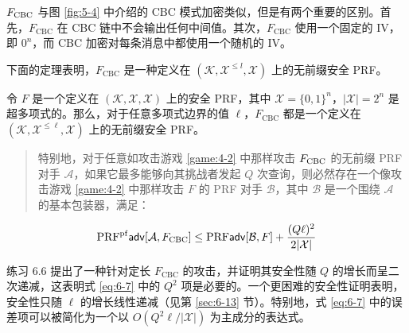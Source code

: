 \vspace*{5pt}

\noindent
$F_{\rm CBC}$ 与图 \ref{fig:5-4}	中介绍的 CBC 模式加密类似，但是有两个重要的区别。首先，$F_\mathrm{CBC}$ 在 CBC 链中不会输出任何中间值。其次，$F_\mathrm{CBC}$ 使用一个固定的 IV，即 $0^n$，而 CBC 加密对每条消息中都使用一个随机的 IV。

下面的定理表明，$F_\mathrm{CBC}$ 是一种定义在 $(\mathcal{K},\mathcal{X}^{\leq l},\mathcal{X})$ 上的无前缀安全 PRF。

\begin{theorem}\label{theo:6-3}
令 $F$ 是一个定义在 $(\mathcal{K},\mathcal{X},\mathcal{X})$ 上的安全 PRF，其中 $\mathcal{X}=\{0,1\}^n$，$|\mathcal{X}|=2^n$ 是超多项式的。那么，对于任意多项式边界的值 $\ell$，$F_\mathrm{CBC}$ 都是一个定义在 $(\mathcal{K},\mathcal{X}^{\leq\ell},\mathcal{X})$ 上的无前缀安全 PRF。
\begin{quote}
特别地，对于任意如攻击游戏 \ref{game:4-2} 中那样攻击 $F_{\rm CBC}$ 的无前缀 PRF 对手 $\mathcal{A}$，如果它最多能够向其挑战者发起 $Q$ 次查询，则必然存在一个像攻击游戏 \ref{game:4-2} 中那样攻击 $F$ 的 PRF 对手 $\mathcal{B}$，其中 $\mathcal{B}$ 是一个围绕 $\mathcal{A}$ 的基本包装器，满足：
\end{quote}
\begin{equation}\label{eq:6-7}
{\rm PRF^{pf}\mathsf{adv}}[\mathcal{A},F_{\rm CBC}]\leq{\rm PRF\mathsf{adv}}[\mathcal{B},F]+\frac{(Q\ell)^2}{2|\mathcal{X}|}
\end{equation}
\end{theorem}

\noindent
练习 6.6 提出了一种针对定长 $F_\mathrm{CBC}$ 的攻击，并证明其安全性随 $Q$ 的增长而呈二次递减，这表明式 \ref{eq:6-7} 中的 $Q^2$ 项是必要的。一个更困难的安全性证明表明，安全性只随 $\ell$ 的增长线性递减（见第 \ref{sec:6-13} 节）。特别地，式 \ref{eq:6-7} 中的误差项可以被简化为一个以 $O(Q^2\ell/|\mathcal{X}|)$ 为主成分的表达式。

